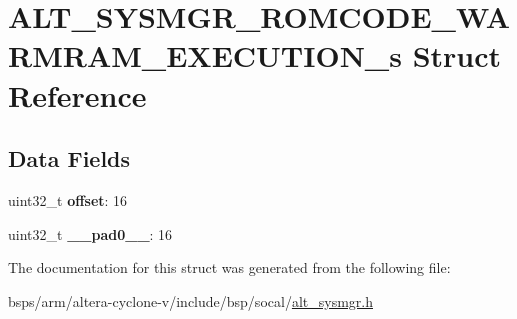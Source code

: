 \hypertarget{structALT__SYSMGR__ROMCODE__WARMRAM__EXECUTION__s}{}\section{A\+L\+T\+\_\+\+S\+Y\+S\+M\+G\+R\+\_\+\+R\+O\+M\+C\+O\+D\+E\+\_\+\+W\+A\+R\+M\+R\+A\+M\+\_\+\+E\+X\+E\+C\+U\+T\+I\+O\+N\+\_\+s Struct Reference}
\label{structALT__SYSMGR__ROMCODE__WARMRAM__EXECUTION__s}
\subsection*{Data Fields}
\begin{DoxyCompactItemize}
\item 
\mbox{\label{structALT__SYSMGR__ROMCODE__WARMRAM__EXECUTION__s_a1e6f059685b68d79930aa35dd85ca611}} 
uint32\+\_\+t {\bfseries offset}\+: 16
\item 
\mbox{\label{structALT__SYSMGR__ROMCODE__WARMRAM__EXECUTION__s_a8daa20c6f29b7d1e2cdc7a8e06a2baa0}} 
uint32\+\_\+t {\bfseries \+\_\+\+\_\+pad0\+\_\+\+\_\+}\+: 16
\end{DoxyCompactItemize}


The documentation for this struct was generated from the following file\+:\begin{DoxyCompactItemize}
\item 
bsps/arm/altera-\/cyclone-\/v/include/bsp/socal/\mbox{\hyperlink{alt__sysmgr_8h}{alt\+\_\+sysmgr.\+h}}\end{DoxyCompactItemize}
